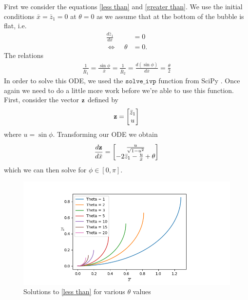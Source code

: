 First we consider the equations \ref{less than} and \ref{greater than}. We use the initial conditions $\bar{x}=\bar{z}_1=0$ at $\theta=0$ as we assume that at the bottom of the bubble is flat, i.e.
\begin{align}
    \frac{d\bar{z}_1}{d\bar{x}}&=0\\
    \Leftrightarrow \:\:\:\:\:\theta&=0.
\end{align}
The relations
\begin{align}
    \frac{1}{\bar{R}_1}=\frac{\sin\phi}{\bar{x}}=\frac{1}{\bar{R}_2}=\frac{d(\sin\phi)}{d\bar{x}}=\frac{\theta}{2}
\end{align}
In order to solve this ODE, we used the $\texttt{solve\_ivp}$ function from SciPy \cite{2020SciPy-NMeth}. Once again we need to do a little more work before we're able to use this function. First, consider the vector $\bf{z}$ defined by
\begin{align}
    \bf{z} = \begin{bmatrix}
           \bar{z}_1 \\
           u \\
         \end{bmatrix}
\end{align}
where $u=\sin \phi$. Transforming our ODE we obtain
\begin{align}
    \frac{d\bf{z}}{d\bar{x}}=\begin{bmatrix}
           \frac{u}{\sqrt{1-u^2}} \\
           -2\bar{z}_1 - \frac{u}{\bar{x}}+\theta \\
         \end{bmatrix}
\end{align}
which we can then solve for $\phi \in [0,\pi]$.
\begin{figure}
    \centering
    \includegraphics[width=0.85\linewidth]{WriteUp/images/bottom curve.png}
    \caption{Solutions to \ref{less than} for various $\theta$ values}
    \label{fig:5}
\end{figure}
